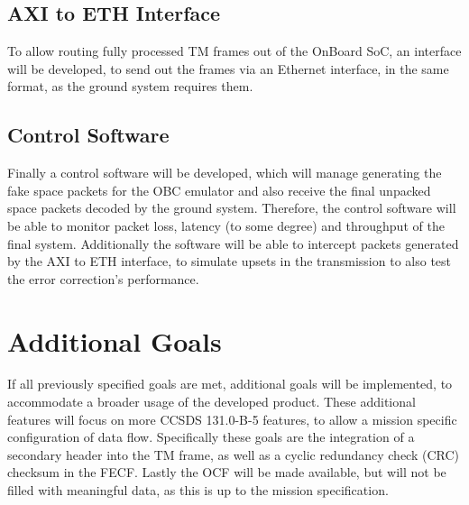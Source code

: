 \subsection{AXI to ETH Interface}

To allow routing fully processed TM frames out of the OnBoard SoC, an interface will be developed, to send out the frames via an Ethernet interface, in the same format, as the ground system requires them.

\subsection{Control Software}

Finally a control software will be developed, which will manage generating the fake space packets for the OBC emulator and also receive the final unpacked space packets decoded by the ground system. Therefore, the control software will be able to monitor packet loss, latency (to some degree) and throughput of the final system. Additionally the software will be able to intercept packets generated by the AXI to ETH interface, to simulate upsets in the transmission to also test the error correction’s performance.

\section{Additional Goals}

If all previously specified goals are met, additional goals will be implemented, to accommodate a broader usage of the developed product. These additional features will focus on more CCSDS 131.0-B-5 features, to allow a mission specific configuration of data flow. Specifically these goals are the integration of a secondary header into the TM frame, as well as a cyclic redundancy check (CRC) checksum in the FECF. Lastly the OCF will be made available, but will not be filled with meaningful data, as this is up to the mission specification.